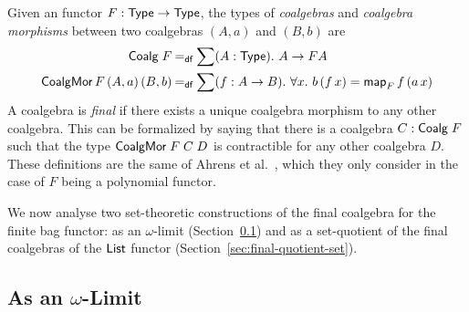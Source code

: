 \documentclass[runningheads]{llncs}
\begin{document}
Given an functor $F : \operatorname{\mathsf{Type}} \to \operatorname{\mathsf{Type}}$, the types of \emph{coalgebras}
and \emph{coalgebra morphisms} between two coalgebras $(A,a)$ and
$(B,b)$ are 
\begin{align*}
  \mathsf{Coalg}\;F &\mathbin{=_\mathsf{df}} \sum (A : \operatorname{\mathsf{Type}}) \mathpunct{.}\, A \to F A \\
  \mathsf{CoalgMor}\,F\,(A,a)\,(B,b) &\mathbin{=_\mathsf{df}} \sum (f : A \to B) \mathpunct{.}\, \forall x \mathpunct{.}\, b \,(f\,x) = \operatorname{\mathsf{map}}_{F} f \,(a \,x)
\end{align*}
A coalgebra is \emph{final} if there exists a unique coalgebra morphism to any other coalgebra. This can be formalized by saying that there is a coalgebra $C : \mathsf{Coalg}\;F$ such that the type $\mathsf{CoalgMor}\;F\;C\;D$ is contractible for any other coalgebra $D$. These definitions are the same of Ahrens et al.~\cite{Ahrens2015}, which they only consider in the case of $F$ being a polynomial functor.

We now analyse two set-theoretic constructions of the final coalgebra for the finite bag functor: as an $\omega$-limit (Section~\ref{sec:final-limit-set}) and as a set-quotient of the final coalgebras of the $\operatorname{\mathsf{List}}$ functor (Section~\ref{sec:final-quotient-set}).

\subsection{As an \ensuremath{\omega}-Limit}\label{sec:final-limit-set}
\end{document}
